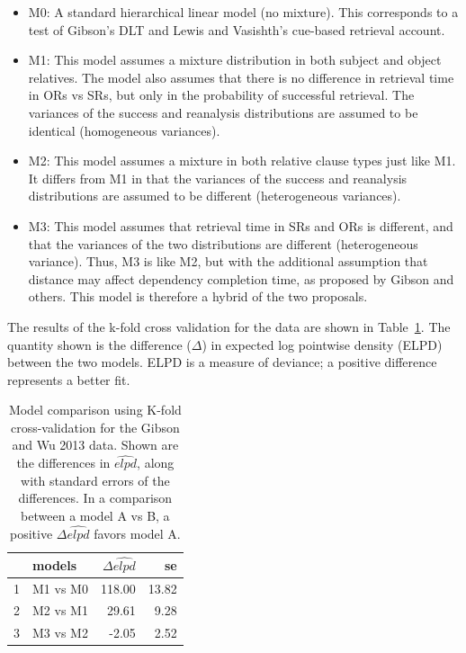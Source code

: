\documentclass{cambridge7A}\usepackage[]{graphicx}\usepackage[]{color}
\begin{document}
\begin{itemize}
\item M0: A standard hierarchical linear model (no mixture). This corresponds to a test of Gibson's DLT and Lewis and Vasishth's cue-based retrieval account.
\item M1: This model assumes a mixture distribution in both subject and object relatives. The model also assumes
that there is no difference in retrieval time in ORs vs SRs, but only in the probability of successful retrieval. The variances of the success and reanalysis distributions are assumed to be identical (homogeneous variances). 
\item M2: This model assumes a mixture in both relative clause types just like M1. It differs from M1 in that the variances of the success and reanalysis distributions are assumed to be different (heterogeneous variances).
\item M3: This model assumes that retrieval time in SRs and ORs is different, and that the variances of the two distributions are different (heterogeneous variance). Thus, M3 is like M2, but with the additional assumption that distance may affect dependency completion time, as proposed by Gibson and others. This model is therefore a hybrid of the two proposals.
\end{itemize}

The results of the k-fold cross validation for the \cite{gibsonwu} data are shown in Table~\ref{tab:modcompgibsonwu}. The quantity shown is the difference ($\Delta$) in expected log pointwise density (ELPD) between the two models. ELPD is  a measure of deviance; a positive  difference represents a better fit.

\begin{table}[!htbp]
\centering
\begin{tabular}{rlrr}
  \hline
 & models & $\Delta \widehat{elpd}$ & se \\ 
  \hline
1 & M1 vs M0 & 118.00 & 13.82 \\ 
  2 & M2 vs M1 & 29.61 & 9.28 \\ 
  3 & M3 vs M2 & -2.05 & 2.52 \\ 
   \hline
\end{tabular}
\caption{Model comparison using K-fold cross-validation for the Gibson and Wu 2013 data. Shown are the differences in $\widehat{elpd}$, along with standard errors of the differences. In a comparison between a model A vs B, a positive $\Delta\widehat{elpd}$ favors model A.} 
\label{tab:modcompgibsonwu}
\end{table}
\end{document}
